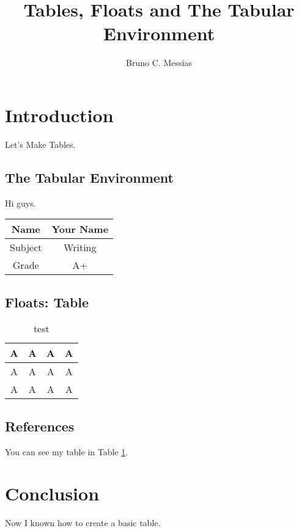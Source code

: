 \documentclass{article}
\title{Tables, Floats and The Tabular Environment}
\author{Bruno C. Messias}
\date{}
\begin{document}
\maketitle

\section{Introduction}

Let's Make Tables.

\subsection{The Tabular Environment}

Hi guys.

\vspace{.5cm}

\begin{tabular}{ |c||c| } 
    \hline
    Name & Your Name \\
    \hline 
    Subject & Writing \\
    \hline 
    Grade & A+ \\
    \hline
\end{tabular}

\subsection{Floats: Table}

\begin{table}[htbp]
	\centering
    \caption{test}
    \begin{center}
	\begin{tabular}{cccc}
		\hline
		A & A & A & A \\ \hline
		A & A & A & A \\
		A & A & A & A \\ \hline
    \end{tabular}
    \end{center}
    \label{tab}
\end{table}


\subsection{References}

You can see my table in Table \ref{tab}.


\section{Conclusion}

Now I known how to create a basic table.
\end{document}

